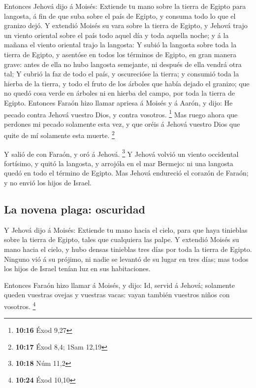  Entonces Jehová dijo á Moisés: Extiende tu mano sobre la
tierra de Egipto para langosta, á fin de que suba sobre el país de
Egipto, y consuma todo lo que el granizo dejó.  Y
extendió Moisés su vara sobre la tierra de Egipto, y Jehová trajo un
viento oriental sobre el país todo aquel día y toda aquella noche; y á
la mañana el viento oriental trajo la langosta:  Y subió
la langosta sobre toda la tierra de Egipto, y asentóse en todos los
términos de Egipto, en gran manera grave: antes de ella no hubo langosta
semejante, ni después de ella vendrá otra tal;  Y cubrió
la faz de todo el país, y oscurecióse la tierra; y consumió toda la
hierba de la tierra, y todo el fruto de los árboles que había dejado el
granizo; que no quedó cosa verde en árboles ni en hierba del campo, por
toda la tierra de Egipto.  Entonces Faraón hizo llamar
apriesa á Moisés y á Aarón, y dijo: He pecado contra Jehová vuestro
Dios, y contra vosotros. \footnote{\textbf{10:16} Éxod 9,27}
 Mas ruego ahora que perdones mi pecado solamente esta
vez, y que oréis á Jehová vuestro Dios que quite de mí solamente esta
muerte. \footnote{\textbf{10:17} Éxod 8,4; 1Sam 12,19}

 Y salió de con Faraón, y oró á Jehová. \footnote{\textbf{10:18}
  Núm 11,2}  Y Jehová volvió un viento occidental
fortísimo, y quitó la langosta, y arrojóla en el mar Bermejo: ni una
langosta quedó en todo el término de Egipto.  Mas Jehová
endureció el corazón de Faraón; y no envió los hijos de Israel.

\hypertarget{la-novena-plaga-oscuridad}{%
\subsection{La novena plaga:
oscuridad}\label{la-novena-plaga-oscuridad}}

 Y Jehová dijo á Moisés: Extiende tu mano hacia el cielo,
para que haya tinieblas sobre la tierra de Egipto, tales que cualquiera
las palpe.  Y extendió Moisés su mano hacia el cielo, y
hubo densas tinieblas tres días por toda la tierra de Egipto.
 Ninguno vió á su prójimo, ni nadie se levantó de su
lugar en tres días; mas todos los hijos de Israel tenían luz en sus
habitaciones.

 Entonces Faraón hizo llamar á Moisés, y dijo: Id, servid
á Jehová; solamente queden vuestras ovejas y vuestras vacas: vayan
también vuestros niños con vosotros. \footnote{\textbf{10:24} Éxod 10,10}

